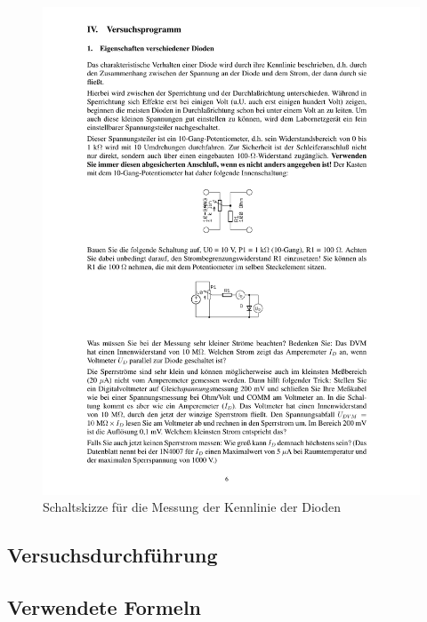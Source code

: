 \documentclass[12pt,a4paper]{article}
\begin{document}
\begin{figure}[H] 
  \centering
    \includegraphics[trim = 10mm 100mm 10mm 155mm, clip, scale = 1]{ep2_14[Page6].pdf}
  	\caption[Schaltskizze für die Messung der Kennlinie der Dioden]{Schaltskizze für die Messung der Kennlinie der Dioden\footnotemark}
  \label{fig:1}
\end{figure}


\subsection{Versuchsdurchführung}
\subsection{Verwendete Formeln}
\end{document}
